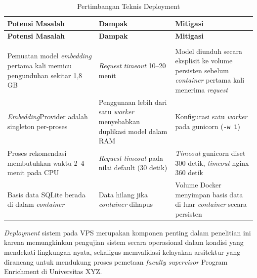 \begin{longtable}[c]{|p{4.5cm}|p{3cm}|p{5.5cm}|}

\hline
\textbf{Potensi Masalah} & \textbf{Dampak} & \textbf{Mitigasi} \\ \hline
\endfirsthead

\hline
\textbf{Potensi Masalah} & \textbf{Dampak} & \textbf{Mitigasi} \\ \hline
\endhead

\hline
\caption{Pertimbangan Teknis Deployment} \label{table:deployment_issues} \\
\endlastfoot

Pemuatan model \textit{embedding} pertama kali memicu pengunduhan sekitar 1,8 GB & \textit{Request} \textit{timeout} 10–20 menit & Model diunduh secara eksplisit ke volume persisten sebelum \textit{container} pertama kali menerima \textit{request} \\ \hline
\textit{Embedding}Provider adalah singleton per-proses & Penggunaan lebih dari satu \textit{worker} menyebabkan duplikasi model dalam RAM & Konfigurasi satu \textit{worker} pada gunicorn (\texttt{-w 1}) \\ \hline
Proses rekomendasi membutuhkan waktu 2–4 menit pada CPU & \textit{Request} \textit{timeout} pada nilai default (30 detik) & \textit{Timeout} gunicorn diset 300 detik, \textit{timeout} nginx 360 detik \\ \hline
Basis data SQLite berada di dalam \textit{container} & Data hilang jika \textit{container} dihapus & Volume Docker menyimpan basis data di luar \textit{container} secara persisten \\ \hline

\end{longtable}

\textit{Deployment} sistem pada VPS merupakan komponen penting dalam penelitian ini karena memungkinkan pengujian sistem secara operasional dalam kondisi yang mendekati lingkungan nyata, sekaligus memvalidasi kelayakan arsitektur yang dirancang untuk mendukung proses pemetaan \textit{faculty supervisor} Program Enrichment di Universitas XYZ.

